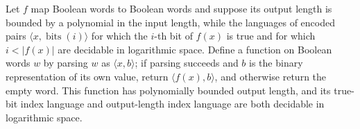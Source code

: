 \begin{theorem}
\label{Complexity.ImplicitlyLogspaceComputable.compQ}
\leanok
{}
Let $f$ map Boolean words to Boolean words and suppose its output length is bounded by a
polynomial in the input length, while the languages of encoded pairs $\langle
x,\operatorname{bits}(i)\rangle$ for which the $i$-th bit of $f(x)$ is true and for
which $i<|f(x)|$ are decidable in logarithmic space. Define a function on Boolean words
$w$ by parsing $w$ as $\langle x,b\rangle$; if parsing succeeds and $b$ is the binary
representation of its own value, return $\langle f(x),b\rangle$, and otherwise return
the empty word. This function has polynomially bounded output length, and its true-bit
index language and output-length index language are both decidable in logarithmic space.
\end{theorem}
